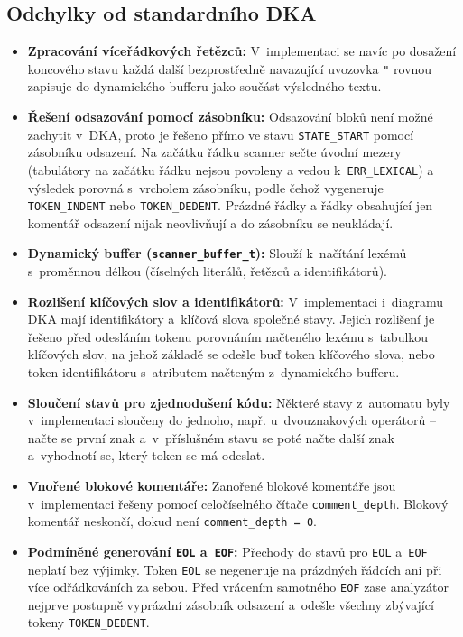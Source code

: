 \documentclass[]{ifjclass}
\begin{document}
        \subsection{Odchylky od standardního DKA}\label{subsec:odchylky}
        \begin{itemize}
    \item \textbf{Zpracování víceřádkových řetězců:} V~implementaci se navíc po dosažení koncového stavu každá další bezprostředně navazující uvozovka \texttt{"} rovnou zapisuje do dynamického bufferu jako součást výsledného textu.

    \item \textbf{Řešení odsazování pomocí zásobníku:} Odsazování bloků není možné zachytit v~DKA, proto je řešeno přímo ve stavu \texttt{STATE\_START} pomocí zásobníku odsazení. Na začátku řádku scanner sečte úvodní mezery (tabulátory na začátku řádku nejsou povoleny a vedou k~\texttt{ERR\_LEXICAL}) a výsledek porovná s~vrcholem zásobníku, podle čehož vygeneruje \texttt{TOKEN\_INDENT} nebo \texttt{TOKEN\_DEDENT}. Prázdné řádky a řádky obsahující jen komentář odsazení nijak neovlivňují a do zásobníku se neukládají.

    \item \textbf{Dynamický buffer (\texttt{scanner\_buffer\_t}):} Slouží k~načítání lexémů s~proměnnou délkou (číselných literálů, řetězců a identifikátorů).

    \item \textbf{Rozlišení klíčových slov a identifikátorů:} V~implementaci i~diagramu DKA mají identifikátory a~klíčová slova společné stavy. Jejich rozlišení je řešeno před odesláním tokenu porovnáním načteného lexému s~tabulkou klíčových slov, na jehož základě se odešle buď token klíčového slova, nebo token identifikátoru s~atributem načteným z~dynamického bufferu.

    \item \textbf{Sloučení stavů pro zjednodušení kódu:} Některé stavy z~automatu byly v~implementaci sloučeny do jednoho, např. u~dvouznakových operátorů -- načte se první znak a~v~příslušném stavu se poté načte další znak a~vyhodnotí se, který token se má odeslat.

    \item \textbf{Vnořené blokové komentáře:} Zanořené blokové komentáře jsou v~implementaci řešeny pomocí celočíselného čítače \texttt{comment\_depth}. Blokový komentář neskončí, dokud není \texttt{comment\_depth = 0}.

    \item \textbf{Podmíněné generování \texttt{EOL} a~\texttt{EOF}:} Přechody do stavů pro \texttt{EOL} a~\texttt{EOF} neplatí bez výjimky. Token \texttt{EOL} se negeneruje na prázdných řádcích ani při více odřádkováních za sebou. Před vrácením samotného \texttt{EOF} zase analyzátor nejprve postupně vyprázdní zásobník odsazení a~odešle všechny zbývající tokeny \texttt{TOKEN\_DEDENT}.


\end{itemize}
\end{document}
